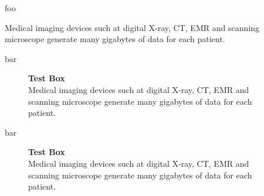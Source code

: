 \documentclass{article}
\newlength{\strutheight}
\begin{document}
  \settoheight{\strutheight}{\strut}

  foo \begin{minipage}[t]{3cm}
      Medical imaging devices such at digital X-ray, CT, EMR and scanning
  microscope generate many gigabytes of data for each
  patient. 
      \end{minipage}

bar \begin{adjustbox}{valign=T,raise=\strutheight,minipage={.85\linewidth}}
  \begin{wrapfigure}{r}{0pt}
    \begin{minipage}[t]{3cm}
      \begin{mdframed}[style=ML]{\footnotesize{\bf Test Box}\\
          Medical imaging devices such at digital X-ray, CT, EMR and scanning
          microscope generate many gigabytes of data for each
          patient.}
      \end{mdframed}
    \end{minipage}
  \end{wrapfigure}
  \strut \lipsum[2]
\end{adjustbox}


bar %
  \begin{wrapfigure}{r}{0pt}
    \begin{minipage}[t]{3cm}
      \begin{mdframed}[style=ML]{\footnotesize{\bf Test Box}\\
          Medical imaging devices such at digital X-ray, CT, EMR and scanning
          microscope generate many gigabytes of data for each
          patient.}
      \end{mdframed}
    \end{minipage}
  \end{wrapfigure}
  \strut \lipsum[2]
\end{document}
